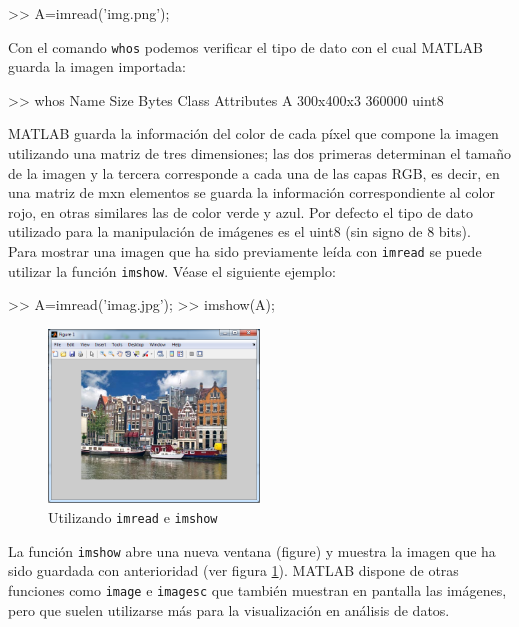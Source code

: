 \begin{matlab}
>> A=imread('img.png');
\end{matlab}

Con el comando \texttt{whos} podemos verificar el tipo de dato con el
cual MATLAB guarda la imagen importada:

\begin{matlab}
>> whos
  Name        Size                Bytes  Class    Attributes
  A         300x400x3            360000  uint8    
\end{matlab}

MATLAB guarda la información del color de cada píxel que compone la
imagen utilizando una matriz de tres dimensiones; las dos primeras
determinan el tamaño de la imagen y la tercera corresponde a cada una de
las capas RGB, es decir, en una matriz de mxn elementos se guarda la
información correspondiente al color rojo, en otras similares las de
color verde y azul. Por defecto el tipo de dato utilizado para la
manipulación de imágenes es el uint8 (sin signo de 8 bits). \\

Para mostrar una imagen que ha sido previamente leída con \texttt{imread} se
puede utilizar la función \texttt{imshow}. Véase el siguiente ejemplo:

\begin{matlab}
>> A=imread('imag.jpg');
>> imshow(A);
\end{matlab}

\begin{figure}[htbp]
    \centering
    \includegraphics[width=0.5\textwidth]{src/img/ch7/holland_imshow.png}
    \caption{Utilizando \texttt{imread} e \texttt{imshow}}
    \label{fig:holland_imshow}
\end{figure}


La función \texttt{imshow} abre una nueva ventana (figure) y muestra la
imagen que ha sido guardada con anterioridad (ver figura \ref{fig:holland_imshow}). 
MATLAB dispone de otras funciones como \texttt{image} e \texttt{imagesc} que también muestran en pantalla las
imágenes, pero que suelen utilizarse más para la visualización en
análisis de datos.


